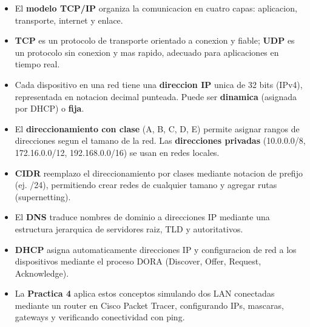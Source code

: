 \begin{itemize}
    \item El \textbf{modelo TCP/IP} organiza la comunicacion en cuatro capas: aplicacion, transporte, internet y enlace.
    \item \textbf{TCP} es un protocolo de transporte orientado a conexion y fiable; \textbf{UDP} es un protocolo sin conexion y mas rapido, adecuado para aplicaciones en tiempo real.
    \item Cada dispositivo en una red tiene una \textbf{direccion IP} unica de 32 bits (IPv4), representada en notacion decimal punteada. Puede ser \textbf{dinamica} (asignada por DHCP) o \textbf{fija}.
    \item El \textbf{direccionamiento con clase} (A, B, C, D, E) permite asignar rangos de direcciones segun el tamano de la red. Las \textbf{direcciones privadas} (10.0.0.0/8, 172.16.0.0/12, 192.168.0.0/16) se usan en redes locales.
    \item \textbf{CIDR} reemplazo el direccionamiento por clases mediante notacion de prefijo (ej. /24), permitiendo crear redes de cualquier tamano y agregar rutas (supernetting).
    \item El \textbf{DNS} traduce nombres de dominio a direcciones IP mediante una estructura jerarquica de servidores raiz, TLD y autoritativos.
    \item \textbf{DHCP} asigna automaticamente direcciones IP y configuracion de red a los dispositivos mediante el proceso DORA (Discover, Offer, Request, Acknowledge).
    \item La \textbf{Practica 4} aplica estos conceptos simulando dos LAN conectadas mediante un router en Cisco Packet Tracer, configurando IPs, mascaras, gateways y verificando conectividad con ping.
\end{itemize}
